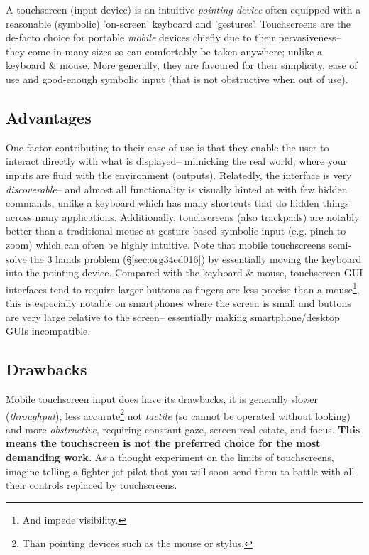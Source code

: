 \documentclass[logo,bsc,singlespacing,parskip]{infthesis}
\begin{document}
A touchscreen (input device) is an intuitive  \emph{pointing device} often equipped with a reasonable (symbolic) 'on-screen' keyboard and 'gestures'.
Touchscreens are the de-facto choice for portable \emph{mobile} devices chiefly due to their pervasiveness-- they come in many sizes so can comfortably be taken anywhere; unlike a keyboard \& mouse.
More generally, they are favoured for their simplicity, ease of use and good-enough symbolic input (that is not obstructive when out of use).
\subsection{Advantages}
\label{sec:orgfba1b9d}
One factor contributing to their ease of use is that they enable the user to interact directly with what is displayed-- mimicking the real world, where your inputs are fluid with the environment (outputs).
Relatedly, the interface is very \emph{discoverable}-- and almost all functionality is visually hinted at with few hidden commands, unlike a keyboard which has many shortcuts that do hidden things across many applications.
Additionally, touchscreens (also trackpads) are notably better than a traditional mouse at gesture based symbolic input (e.g. pinch to zoom) which can often be highly intuitive.
Note that mobile touchscreens semi-solve \hyperref[sec:org34ed016]{the 3 hands problem} (\S \ref{sec:org34ed016}) by essentially moving the keyboard into the pointing device.
Compared with the keyboard \& mouse, touchscreen GUI interfaces tend to require larger buttons as fingers are less precise than a mouse\footnote{And impede visibility.}, this is especially notable on smartphones where the screen is small and buttons are very large relative to the screen-- essentially making smartphone/desktop GUIs incompatible.

\subsection{Drawbacks}
\label{sec:org3e142e6}
Mobile touchscreen input does have its drawbacks, it is generally slower (\emph{throughput}), less accurate\footnote{Than pointing devices such as the mouse or stylus.}   not \emph{tactile} (so cannot be operated without looking) and more \emph{obstructive}, requiring constant gaze, screen real estate, and focus.
\textbf{This means the touchscreen is not the preferred choice for the most demanding work.}
As a thought experiment on the limits of  touchscreens, imagine telling a fighter jet pilot that you will soon send them to battle with all their controls replaced by touchscreens.
\end{document}
